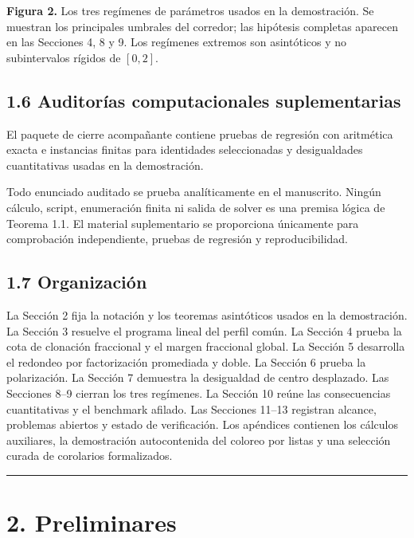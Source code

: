 \documentclass[
  spanish,
  11pt,
  a4paper,
]{article}
\begin{document}
\textbf{Figura 2.} Los tres regímenes de parámetros usados en la demostración. Se muestran los principales umbrales del corredor; las hipótesis completas aparecen en las Secciones 4, 8 y 9. Los regímenes extremos son asintóticos y no subintervalos rígidos de \([0,2]\).

\subsection{1.6 Auditorías computacionales suplementarias}\label{auditoruxedas-computacionales-suplementarias}

El paquete de cierre acompañante contiene pruebas de regresión con aritmética exacta e instancias finitas para identidades seleccionadas y desigualdades cuantitativas usadas en la demostración.

Todo enunciado auditado se prueba analíticamente en el manuscrito. Ningún cálculo, script, enumeración finita ni salida de solver es una premisa lógica de Teorema 1.1. El material suplementario se proporciona únicamente para comprobación independiente, pruebas de regresión y reproducibilidad.

\subsection{1.7 Organización}\label{organizaciuxf3n}

La Sección 2 fija la notación y los teoremas asintóticos usados en la demostración. La Sección 3 resuelve el programa lineal del perfil común. La Sección 4 prueba la cota de clonación fraccional y el margen fraccional global. La Sección 5 desarrolla el redondeo por factorización promediada y doble. La Sección 6 prueba la polarización. La Sección 7 demuestra la desigualdad de centro desplazado. Las Secciones 8--9 cierran los tres regímenes. La Sección 10 reúne las consecuencias cuantitativas y el benchmark afilado. Las Secciones 11--13 registran alcance, problemas abiertos y estado de verificación. Los apéndices contienen los cálculos auxiliares, la demostración autocontenida del coloreo por listas y una selección curada de corolarios formalizados.

\begin{center}\rule{0.5\linewidth}{0.5pt}\end{center}

\section{2. Preliminares}\label{preliminares}
\end{document}

